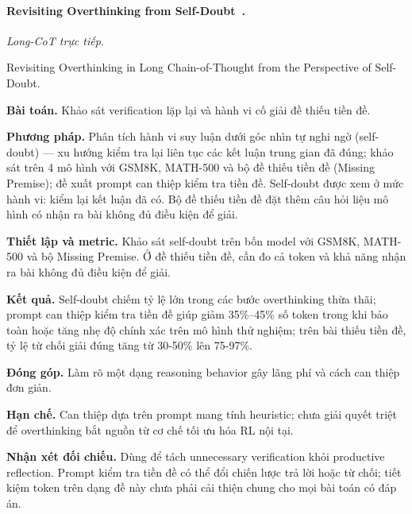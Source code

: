 \begin{samepage}
\paragraph{Revisiting Overthinking from Self-Doubt~\cite{rra3_overthinking}.}
\emph{Long-CoT trực tiếp.}\par
{\raggedright\noindent\small Revisiting Overthinking in Long Chain-of-Thought from the Perspective of Self-Doubt.\par}
\noindent\textbf{Bài toán.} Khảo sát verification lặp lại và hành vi cố giải đề thiếu tiền đề.\par
\end{samepage}
\noindent\textbf{Phương pháp.} Phân tích hành vi suy luận dưới góc nhìn tự nghi ngờ (self-doubt) — xu hướng kiểm tra lại liên tục các kết luận trung gian đã đúng; khảo sát trên 4 mô hình với GSM8K, MATH-500 và bộ đề thiếu tiền đề (Missing Premise); đề xuất prompt can thiệp kiểm tra tiền đề. Self-doubt được xem ở mức hành vi: kiểm lại kết luận đã có. Bộ đề thiếu tiền đề đặt thêm câu hỏi liệu mô hình có nhận ra bài không đủ điều kiện để giải.\par
\noindent\textbf{Thiết lập và metric.} Khảo sát self-doubt trên bốn model với GSM8K, MATH-500 và bộ Missing Premise. Ở đề thiếu tiền đề, cần đo cả token và khả năng nhận ra bài không đủ điều kiện để giải.\par
\noindent\textbf{Kết quả.} Self-doubt chiếm tỷ lệ lớn trong các bước overthinking thừa thãi; prompt can thiệp kiểm tra tiền đề giúp giảm 35\%–45\% số token trong khi bảo toàn hoặc tăng nhẹ độ chính xác trên mô hình thử nghiệm; trên bài thiếu tiền đề, tỷ lệ từ chối giải đúng tăng từ 30-50\% lên 75-97\%.\par
\noindent\textbf{Đóng góp.} Làm rõ một dạng reasoning behavior gây lãng phí và cách can thiệp đơn giản.\par
\noindent\textbf{Hạn chế.} Can thiệp dựa trên prompt mang tính heuristic; chưa giải quyết triệt để overthinking bắt nguồn từ cơ chế tối ưu hóa RL nội tại.\par
\begin{samepage}
\noindent\textbf{Nhận xét đối chiếu.} Dùng để tách unnecessary verification khỏi productive reflection. Prompt kiểm tra tiền đề có thể đổi chiến lược trả lời hoặc từ chối; tiết kiệm token trên dạng đề này chưa phải cải thiện chung cho mọi bài toán có đáp án.\par
{}
\end{samepage}

